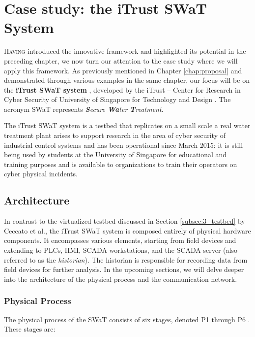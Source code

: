 \chapter{Case study: the iTrust SWaT System}
\label{casestudy}

\lettrine[lines=2]{H}{aving} introduced the innovative framework and highlighted its potential in the preceding chapter, we now turn our attention to the case study where we will apply this framework. As previously mentioned in Chapter \ref{chap:proposal} and demonstrated through various examples in the same chapter, our focus will be on the \textbf{iTrust SWaT system} \cite{swat_home}, developed by the iTrust -- Center for Research in Cyber Security of University of Singapore for Technology and Design \cite{itrust_site}. The acronym SWaT represents \textit{\textbf{S}ecure \textbf{Wa}ter \textbf{T}reatment}.

\bigskip
The iTrust SWaT system is a testbed that replicates on a small scale a real water treatment plant arises to support research in the area of cyber security of industrial control systems and has been operational since March 2015: it is still being used by students at the University of Singapore for educational and training purposes and is available to organizations to train their operators on cyber physical incidents.

\section{Architecture}
\label{sec:5_swat_architecture}
In contrast to the virtualized testbed discussed in Section \ref{subsec:3_testbed} by Ceccato et al., the iTrust SWaT system is composed entirely of physical hardware components. It encompasses various elements, starting from field devices and extending to PLCs, HMI, SCADA workstations, and the SCADA server (also referred to as the \textit{historian}). The historian is responsible for recording data from field devices for further analysis. In the upcoming sections, we will delve deeper into the architecture of the physical process and the communication network.

\subsection{Physical Process} 
\label{subsec:5_swat_physical_architecture}
The physical process of the SWaT consists of six stages, denoted P1 through P6 \cite{swat_tecnical_pdf}\cite{swat_tippenhauer}. These stages are:

